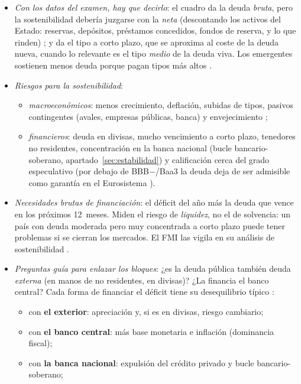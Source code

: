 \documentclass[11pt]{article}
\begin{document}
\begin{itemize}
\item \emph{Con los datos del examen, hay que decirlo}: el cuadro da la deuda \emph{bruta}, pero la sostenibilidad debería juzgarse con la \emph{neta} (descontando los activos del Estado: reservas, depósitos, préstamos concedidos, fondos de reserva, y lo que rinden) \parencite{FMI2018FiscalMonitor}; y da el tipo a corto plazo, que se aproxima al coste de la deuda nueva, cuando lo relevante es el tipo \emph{medio} de la deuda viva. Los emergentes sostienen menos deuda porque pagan tipos más altos \parencite{Reinhart2003Intolerancia}.
\item \emph{Riesgos para la sostenibilidad}:
  \begin{itemize}
  \item \emph{macroeconómicos}: menos crecimiento, deflación, subidas de tipos, pasivos contingentes (avales, empresas públicas, banca) y envejecimiento \parencite{CE2024Envejecimiento};
  \item \emph{financieros}: deuda en divisas, mucho vencimiento a corto plazo, tenedores no residentes, concentración en la banca nacional (bucle bancario-soberano, apartado~\ref{sec:estabilidad}) y calificación cerca del grado especulativo (por debajo de BBB$-$/Baa3 la deuda deja de ser admisible como garantía en el Eurosistema \parencite{BCE2026ECAF}).
  \end{itemize}
\item \emph{Necesidades brutas de financiación}: el déficit del año más la deuda que vence en los próximos 12~meses. Miden el riesgo de \emph{liquidez}, no el de solvencia: un país con deuda moderada pero muy concentrada a corto plazo puede tener problemas si se cierran los mercados. El FMI las vigila en su análisis de sostenibilidad \parencite{FMI2021DSA}.
\item \emph{Preguntas guía para enlazar los bloques}: ¿es la deuda pública también deuda \emph{externa} (en manos de no residentes, en divisas)? ¿La financia el banco central? Cada forma de financiar el déficit tiene su desequilibrio típico \parencite{FMI2013CaseStudy}:
  \begin{itemize}
  \item con \textbf{el exterior}: apreciación y, si es en divisas, riesgo cambiario;
  \item con \textbf{el banco central}: más base monetaria e inflación (dominancia fiscal);
  \item con \textbf{la banca nacional}: expulsión del crédito privado y bucle bancario-soberano;

\end{itemize}
\end{itemize}
\end{document}
